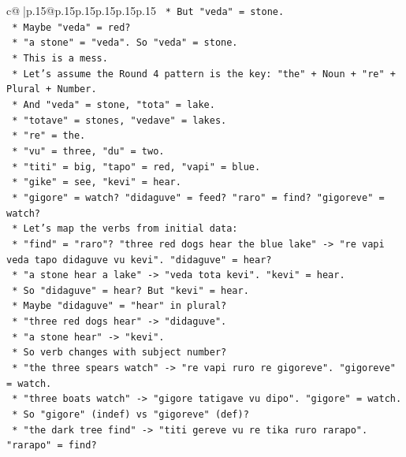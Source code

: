 \documentclass{article}
\begin{document}
{\begin{supertabular}{c@{$\;$}|p{.15\linewidth}@{}p{.15\linewidth}p{.15\linewidth}p{.15\linewidth}p{.15\linewidth}p{.15\linewidth}}
{{{\texttt{        *   But "veda" = stone.} \\
\texttt{        *   Maybe "veda" = red?} \\
\texttt{        *   "a stone" = "veda". So "veda" = stone.} \\
\texttt{        *   This is a mess.} \\
\texttt{        *   Let's assume the Round 4 pattern is the key: "the" + Noun + "re" + Plural + Number.} \\
\texttt{        *   And "veda" = stone, "tota" = lake.} \\
\texttt{        *   "totave" = stones, "vedave" = lakes.} \\
\texttt{        *   "re" = the.} \\
\texttt{        *   "vu" = three, "du" = two.} \\
\texttt{        *   "titi" = big, "tapo" = red, "vapi" = blue.} \\
\texttt{        *   "gike" = see, "kevi" = hear.} \\
\texttt{        *   "gigore" = watch? "didaguve" = feed? "raro" = find? "gigoreve" = watch?} \\
\texttt{        *   Let's map the verbs from initial data:} \\
\texttt{            *   "find" = "raro"? "three red dogs hear the blue lake" {-}> "re vapi veda tapo didaguve vu kevi". "didaguve" = hear?} \\
\texttt{            *   "a stone hear a lake" {-}> "veda tota kevi". "kevi" = hear.} \\
\texttt{            *   So "didaguve" = hear? But "kevi" = hear.} \\
\texttt{            *   Maybe "didaguve" = "hear" in plural?} \\
\texttt{            *   "three red dogs hear" {-}> "didaguve".} \\
\texttt{            *   "a stone hear" {-}> "kevi".} \\
\texttt{            *   So verb changes with subject number?} \\
\texttt{            *   "the three spears watch" {-}> "re vapi ruro re gigoreve". "gigoreve" = watch.} \\
\texttt{            *   "three boats watch" {-}> "gigore tatigave vu dipo". "gigore" = watch.} \\
\texttt{            *   So "gigore" (indef) vs "gigoreve" (def)?} \\
\texttt{            *   "the dark tree find" {-}> "titi gereve vu re tika ruro rarapo". "rarapo" = find?} \\
}}}
\end{supertabular}}
\end{document}
